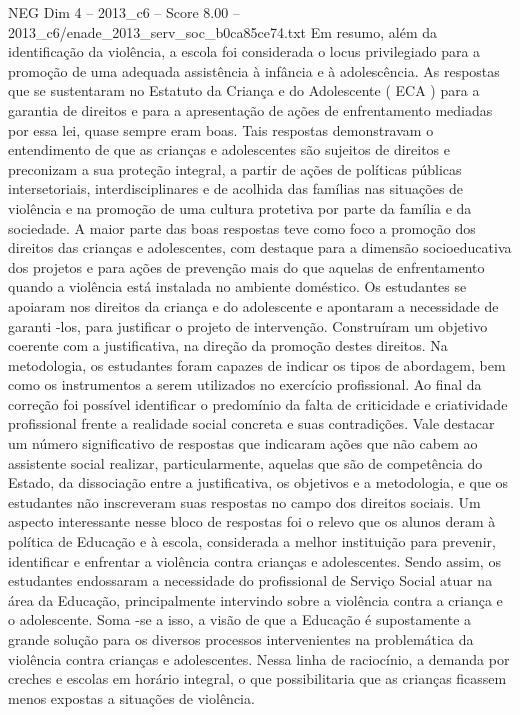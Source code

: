 \begin{textsample}{NEG Dim 4 – 2013\_c6 – Score 8.00 – 2013\_c6/enade\_2013\_serv\_soc\_b0ca85ce74.txt}
Em resumo, além da identificação da violência, a escola foi considerada o locus privilegiado para a promoção de uma adequada assistência à infância e à adolescência.
As respostas que se sustentaram no Estatuto da Criança e do Adolescente ( ECA ) para a garantia de direitos e para a apresentação de ações de enfrentamento mediadas por essa lei, quase sempre eram boas.
Tais respostas demonstravam o entendimento de que as crianças e adolescentes são sujeitos de direitos e preconizam a sua proteção integral, a partir de ações de políticas públicas intersetoriais, interdisciplinares e de acolhida das famílias nas situações de violência e na promoção de uma cultura protetiva por parte da família e da sociedade.
A maior parte das boas respostas teve como foco a promoção dos direitos das crianças e adolescentes, com destaque para a dimensão socioeducativa dos projetos e para ações de prevenção mais do que aquelas de enfrentamento quando a violência está instalada no ambiente doméstico.
Os estudantes se apoiaram nos direitos da criança e do adolescente e apontaram a necessidade de garanti -los, para justificar o projeto de intervenção.
Construíram um objetivo coerente com a justificativa, na direção da promoção destes direitos.
Na metodologia, os estudantes foram capazes de indicar os tipos de abordagem, bem como os instrumentos a serem utilizados no exercício profissional.
Ao final da correção foi possível identificar o predomínio da falta de criticidade e criatividade profissional frente a realidade social concreta e suas contradições.
Vale destacar um número significativo de respostas que indicaram ações que não cabem ao assistente social realizar, particularmente, aquelas que são de competência do Estado, da dissociação entre a justificativa, os objetivos e a metodologia, e que os estudantes não inscreveram suas respostas no campo dos direitos sociais.
Um aspecto interessante nesse bloco de respostas foi o relevo que os alunos deram à política de Educação e à escola, considerada a melhor instituição para prevenir, identificar e enfrentar a violência contra crianças e adolescentes.
Sendo assim, os estudantes endossaram a necessidade do profissional de Serviço Social atuar na área da Educação, principalmente intervindo sobre a violência contra a criança e o adolescente.
Soma -se a isso, a visão de que a Educação é supostamente a grande solução para os diversos processos intervenientes na problemática da violência contra crianças e adolescentes.
Nessa linha de raciocínio, a demanda por creches e escolas em horário integral, o que possibilitaria que as crianças ficassem menos expostas a situações de violência.

\end{textsample}
